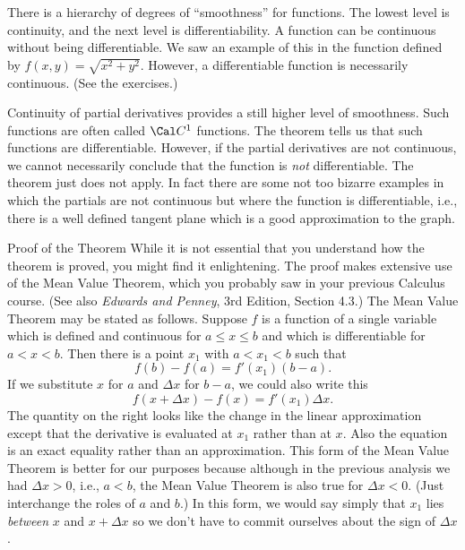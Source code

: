 There is a hierarchy of degrees of ``smoothness'' for functions.
The lowest level is continuity, and the next level is
differentiability.   A function can be continuous without
being differentiable.   We saw an example of this in the
function defined by $f(x,y) = \sqrt{x^2 + y^2}$.  
 However, a differentiable function
is necessarily continuous.   (See the exercises.)


Continuity of partial derivatives provides a still higher level
of smoothness.  Such functions are often called $\Cal C^1$
%
functions.  The theorem tells us that such functions are
differentiable.  However, if the partial derivatives are not
continuous,
we cannot necessarily conclude
that the function is {\it not\/} differentiable.  The
theorem just does not apply.   In fact there are some
not too bizarre examples in which the partials are not continuous
but where the function is  differentiable, i.e., there is a well
defined tangent plane which is a good approximation to the graph.

\subhead Proof of the Theorem \endsubhead
While it is not essential that you understand how the theorem
is proved, you might find it enlightening.   The proof makes
extensive use of the Mean Value Theorem, which you probably
saw in your previous Calculus course.  (See also {\it Edwards and
Penney\/}, 3rd Edition, Section 4.3.)  The Mean Value Theorem
may be stated as follows.  Suppose $f$ is a function of a single
variable
which is defined and continuous for $a \le x \le b$ and which
is differentiable for $a < x < b$.  Then there is a point
$x_1$ with $a < x_1 < b$ such that
$$
     f(b) -  f(a) =  f'(x_1)(b - a).
$$
If we substitute $x$ for $a$ and $\Delta x$
for $b - a$, we could also write this
$$
    f(x + \Delta x) - f(x) = f'(x_1)\Delta x.
$$
The quantity on the right looks like the change in 
the linear approximation
except that the derivative is evaluated at $x_1$ rather than at
$x$.   Also the equation is an exact equality rather than an approximation.
This form of the Mean Value Theorem is better for our purposes because
although in the previous analysis we had $\Delta x > 0$, i.e.,
$a < b$, the Mean Value Theorem
 is also true for $\Delta x < 0$.  (Just interchange the
roles of $a$ and $b$.)   In this form, we would say simply
that $x_1$
 lies {\it between\/} $x$ and $x + \Delta x$ so we don't have to
commit ourselves about the sign of $\Delta x$.

